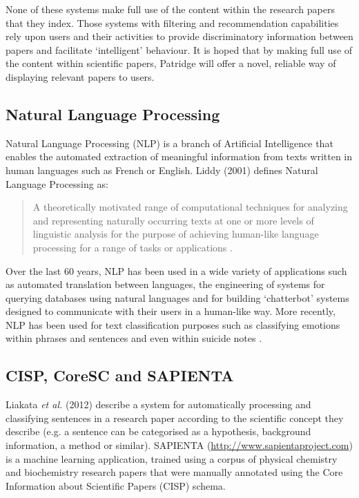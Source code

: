 None of these systems make full use of the content within the research papers
that they index. Those systems with filtering and recommendation capabilities
rely upon users and their activities to provide discriminatory information
between papers and facilitate `intelligent' behaviour. It is hoped that by
making full use of the content within scientific papers, Patridge will offer a
novel, reliable way of displaying relevant papers to users.

\subsection{Natural Language Processing}

Natural Language Processing (NLP)  is a branch of Artificial Intelligence that
enables the automated extraction of meaningful information from texts written
in human languages such as French or English. Liddy (2001) defines Natural
Language Processing as:

\begin{quotation} 
A theoretically motivated range of computational techniques for analyzing and
representing naturally occurring texts at one or more levels of linguistic
analysis for the purpose of achieving human-like language processing for a
range of tasks or applications \cite{liddy2001natural}.  
\end{quotation}

Over the last 60 years, NLP has been used in a wide variety of applications
such as automated translation between languages\cite{hutchins2004first}, the
engineering of systems for querying databases using natural languages
\cite{rao2010natural} and for building `chatterbot' systems designed to
communicate with their users in a human-like way\cite{Alfonsi2006}.
More recently, NLP has been used for text classification purposes such as
classifying emotions within phrases and sentences \cite{Wilson05Polarity} and
even within suicide notes \cite{citeulike:11077287}.


\subsection{CISP, CoreSC and SAPIENTA}

Liakata \emph{et al.} (2012) describe a system for automatically processing and
classifying sentences in a research paper according to the scientific concept
they describe (e.g. a sentence can be categorised as a hypothesis, background
information, a method or similar)\cite{citeulike:10444769}. SAPIENTA
(\url{http://www.sapientaproject.com}) is a machine learning application,
trained using a corpus of physical chemistry and biochemistry research papers
that were manually annotated using the Core Information about Scientific
Papers (CISP)\cite{LIAKATA10.644} schema. 

